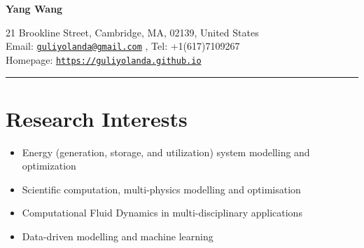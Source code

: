 \documentclass[letterpaper]{article}
\def\name{Yang Wang}
\begin{document}

\centerline{\LARGE \bf \name}


\begin{minipage}{\linewidth}
\begin{center}
21 Brookline Street, Cambridge, MA, 02139, United States\\
Email: \href{mailto:guliyolanda@gmail.com}{\tt guliyolanda@gmail.com} , Tel: +1(617)7109267 \\
Homepage:  \href{https://guliyolanda.github.io}{\tt https://guliyolanda.github.io} \\
\end{center}
\end{minipage}

\vspace{0pt}
\rule{\textwidth}{1pt}

\vspace{-12pt}
\section*{Research Interests}
\vspace{-10pt}
\begin{itemize}
\item Energy (generation, storage, and utilization) system modelling and optimization
\item Scientific computation, multi-physics modelling and optimisation
\item Computational Fluid Dynamics in multi-disciplinary applications
\item Data-driven modelling and machine learning 

\end{itemize}

\vspace{-12pt}
\end{document}
